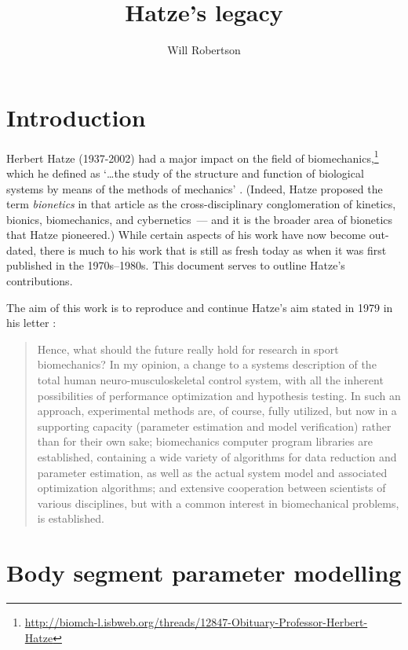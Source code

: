 \documentclass[a4paper]{article}
\begin{document}
\title{Hatze's legacy}
\author{Will Robertson}
\maketitle

\section{Introduction}

Herbert Hatze (1937-2002) had a major impact on the field of biomechanics,\footnote{\url{http://biomch-l.isbweb.org/threads/12847-Obituary-Professor-Herbert-Hatze}}
which he defined as `\dots the study of the structure and function of biological systems by means of the methods of mechanics' \parencite{hatze1974-biomech}.
(Indeed, Hatze proposed the term \emph{bionetics} in that article as the cross-disciplinary conglomeration of kinetics, bionics, biomechanics, and cybernetics~--- and it is the broader area of bionetics that Hatze pioneered.)
While certain aspects of his work have now become out-dated, there is much to his work that is still as fresh today as when it was first published in the 1970s--1980s.
This document serves to outline Hatze's contributions.

The aim of this work is to reproduce and continue Hatze's aim stated in 1979 in his letter  \parencite{hatze1979-biomech-letter}:
\begin{quote}
Hence, what should the future really hold for research in 
sport biomechanics? In my opinion, a change to a systems 
description of the total human neuro-musculoskeletal control 
system, with all the inherent possibilities of performance 
optimization and hypothesis testing. In such an approach, 
experimental methods are, of course, fully utilized, but now in 
a supporting capacity (parameter estimation and model 
verification) rather than for their own sake; biomechanics 
computer program libraries are established, containing a 
wide variety of algorithms for data reduction and parameter 
estimation, as well as the actual system model and associated 
optimization algorithms; and extensive cooperation between 
scientists of various disciplines, but with a common interest in 
biomechanical problems, is established.
\end{quote}

\section{Body segment parameter modelling}
\end{document}
